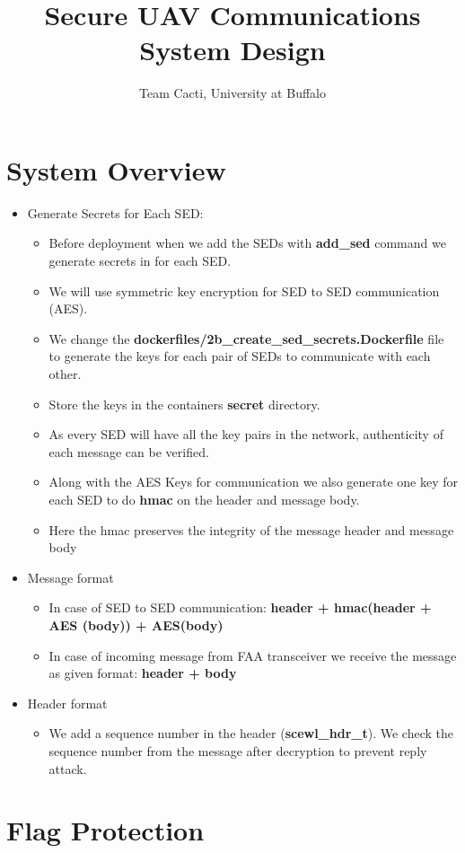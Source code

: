 \documentclass[11pt,oneside,onecolumn,letterpaper]{article}
\title{Secure UAV Communications System Design}
\author{Team Cacti, University at Buffalo}
\date{}
\begin{document}
\normalsize


\maketitle

\renewcommand{\thepage}{System Design, Cacti, UB--\arabic{page}}
\setcounter{page}{1} \normalsize
%

\newcommand{\flagRollback}{\textsf{Rollback}\xspace}

\section{System Overview}
\begin{itemize}
  \item Generate Secrets for Each SED:
  \begin{itemize}
   \item Before deployment when we add the SEDs with \textbf{add\_sed}  
   	command we generate secrets in for each SED. 
   	\item We will use symmetric key encryption for SED to SED communication (AES).
   	\item We change the  \textbf{dockerfiles/2b\_create\_sed\_secrets.Dockerfile} file to generate the keys for each pair of SEDs to communicate with each other.
   	\item Store the keys in the containers \textbf{secret} directory.
   	\item As every SED will have all the key pairs in the network, authenticity of each message can be verified.
   	\item Along with the AES Keys for communication we also generate one key for each SED to do \textbf{hmac} on the header and message body. 
   	\item Here the hmac preserves the integrity of the message header and message body
   \end{itemize}
  \item Message format
  \begin{itemize}
  \item In case of SED to SED communication: \textbf{header + hmac(header + AES (body)) + AES(body)}
  \item In case of incoming message from FAA transceiver we receive the message as given format: \textbf{header + body}
  \end{itemize}
  \item Header format
  \begin{itemize}
  \item We add a sequence number in the header (\textbf{scewl\_hdr\_t}). We check the sequence number from the message after decryption to prevent reply attack.
  \end{itemize}
 
\end{itemize}
\section{Flag Protection}

\end{document}
